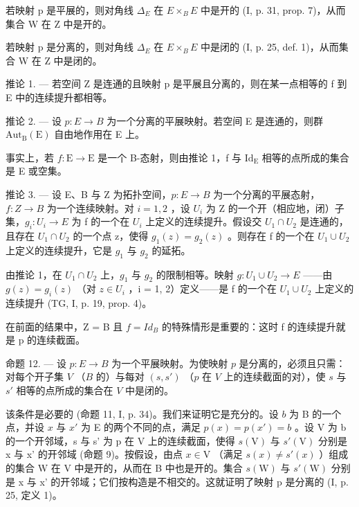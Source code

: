 若映射 p 是平展的，则对角线 \(\Delta_{E}\) 在 \(E \times_{B} E\) 中是开的 (I, p. 31, prop. 7)，从而集合 W 在 Z 中是开的。

若映射 p 是分离的，则对角线 \(\Delta_{E}\) 在 \(E \times_{B} E\) 中是闭的 (I, p. 25, def. 1)，从而集合 W 在 Z 中是闭的。

推论 1. --- 若空间 Z 是连通的且映射 p 是平展且分离的，则在某一点相等的 f 到 E 中的连续提升都相等。

推论 2. --- 设 \(p\colon E \to B\) 为一个分离的平展映射。若空间 E 是连通的，则群 \(\mathrm{Aut}_{\mathrm{B}}(\mathrm{E})\) 自由地作用在 E 上。

事实上，若 \(f: \mathrm{E} \to \mathrm{E}\) 是一个 B-态射，则由推论 1，f 与 \(\mathrm{Id}_{\mathrm{E}}\) 相等的点所成的集合是 E 或空集。

推论 3. --- 设 E、B 与 Z 为拓扑空间，\(p\colon E \to B\) 为一个分离的平展态射，\(f\colon Z \to B\) 为一个连续映射。对 \(i = 1,2\) ，设 \(U_i\) 为 Z 的一个开（相应地，闭）子集，\(g_i\colon U_i \to E\) 为 f 的一个在 \(U_i\) 上定义的连续提升。假设交 \(U_1 \cap U_2\) 是连通的，且存在 \(U_1 \cap U_2\) 的一个点 z，使得 \(g_1(z) = g_2(z)\) 。则存在 f 的一个在 \(U_1 \cup U_2\) 上定义的连续提升，它是 \(g_1\) 与 \(g_2\) 的延拓。

由推论 1，在 \(U_{1} \cap U_{2}\) 上，\(g_{1}\) 与 \(g_{2}\) 的限制相等。映射 \(g: U_{1} \cup U_{2} \to E\) ——由 \(g(z) = g_{i}(z)\) （对 \(z \in U_{i}\) ，i = 1, 2）定义——是 f 的一个在 \(U_{1} \cup U_{2}\) 上定义的连续提升 (TG, I, p. 19, prop. 4)。

在前面的结果中，Z = B 且 \(f = Id_{B}\) 的特殊情形是重要的：这时 f 的连续提升就是 p 的连续截面。

命题 12. --- 设 \(p \colon E \to B\) 为一个平展映射。为使映射 \(p\) 是分离的，必须且只需：对每个开子集 \(V\) （\(B\) 的）与每对 \((s, s')\) （\(p\) 在 \(V\) 上的连续截面的对），使 \(s\) 与 \(s'\) 相等的点所成的集合在 \(V\) 中是闭的。

该条件是必要的 (命题 11, I, p. 34)。我们来证明它是充分的。设 \(b\) 为 B 的一个点，并设 \(x\) 与 \(x'\) 为 E 的两个不同的点，满足 \(p(x) = p(x') = b\) 。设 V 为 b 的一个开邻域，s 与 s' 为 p 在 V 上的连续截面，使得 \(s(\mathrm{V})\) 与 \(s'(\mathrm{V})\) 分别是 x 与 x' 的开邻域 (命题 9)。按假设，由点 \(x \in \mathrm{V}\) （满足 \(s(x) \ne s'(x)\) ）组成的集合 W 在 V 中是开的，从而在 B 中也是开的。集合 \(s(\mathrm{W})\) 与 \(s'(\mathrm{W})\) 分别是 x 与 x' 的开邻域；它们按构造是不相交的。这就证明了映射 p 是分离的 (I, p. 25, 定义 1)。
\relax{}
